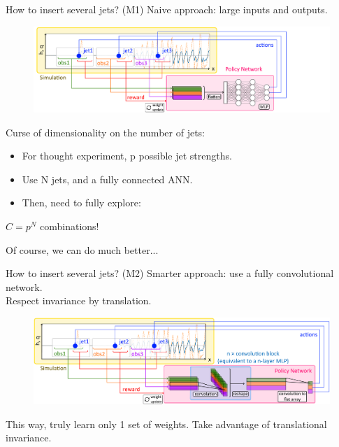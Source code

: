 \documentclass{beamer}
\begin{document}
\begin{frame}{How to insert several jets? (M1)}
Naive approach: large inputs and outputs. \\

  \begin{figure}
    \begin{center}
      \includegraphics[width=.98\textwidth]{Figures/graph_mlp_final}
    \end{center}
    \end{figure}
    
Curse of dimensionality on the number of jets:

    \begin{itemize}
        \item For thought experiment, p possible jet strengths.
        \item Use N jets, and a fully connected ANN.
        \item Then, need to fully explore:
    \end{itemize}

    \begin{center}
        $C = p^N $ combinations!
    \end{center}

    Of course, we can do much better...
\end{frame}

\begin{frame}{How to insert several jets? (M2)}
Smarter approach: use a fully convolutional network. \\

Respect invariance by translation. \\

  \begin{figure}
    \begin{center}
      \includegraphics[width=.98\textwidth]{Figures/graph_cnn_final}
    \end{center}
    \end{figure}
   
This way, truly learn only 1 set of weights. Take advantage of translational invariance.
\end{frame}
\end{document}
